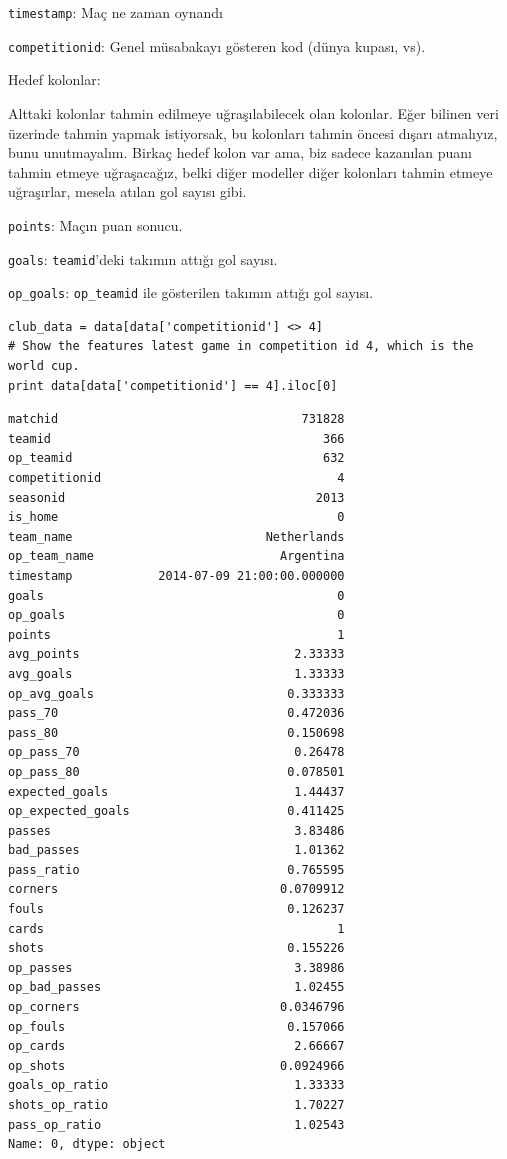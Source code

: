 \documentclass[12pt,fleqn]{article}\usepackage{../../common}
\begin{document}
\verb!timestamp!: Maç ne zaman oynandı

\verb!competitionid!: Genel müsabakayı gösteren kod (dünya kupası, vs).

Hedef kolonlar:

Alttaki kolonlar tahmin edilmeye uğraşılabilecek olan kolonlar. Eğer
bilinen veri üzerinde tahmin yapmak istiyorsak, bu kolonları tahmin öncesi
dışarı atmalıyız, bunu unutmayalım. Birkaç hedef kolon var ama, biz
sadece kazanılan puanı tahmin etmeye uğraşacağız, belki diğer modeller
diğer kolonları tahmin etmeye uğraşırlar, mesela atılan gol sayısı gibi.

\verb!points!: Maçın puan sonucu.

\verb!goals!: \verb!teamid!'deki takımın attığı gol sayısı.

\verb!op_goals!: \verb!op_teamid! ile gösterilen takımın attığı gol sayısı.

\begin{verbatim}
club_data = data[data['competitionid'] <> 4]
# Show the features latest game in competition id 4, which is the world cup.
print data[data['competitionid'] == 4].iloc[0]
\end{verbatim}

\begin{verbatim}
matchid                                  731828
teamid                                      366
op_teamid                                   632
competitionid                                 4
seasonid                                   2013
is_home                                       0
team_name                           Netherlands
op_team_name                          Argentina
timestamp            2014-07-09 21:00:00.000000
goals                                         0
op_goals                                      0
points                                        1
avg_points                              2.33333
avg_goals                               1.33333
op_avg_goals                           0.333333
pass_70                                0.472036
pass_80                                0.150698
op_pass_70                              0.26478
op_pass_80                             0.078501
expected_goals                          1.44437
op_expected_goals                      0.411425
passes                                  3.83486
bad_passes                              1.01362
pass_ratio                             0.765595
corners                               0.0709912
fouls                                  0.126237
cards                                         1
shots                                  0.155226
op_passes                               3.38986
op_bad_passes                           1.02455
op_corners                            0.0346796
op_fouls                               0.157066
op_cards                                2.66667
op_shots                              0.0924966
goals_op_ratio                          1.33333
shots_op_ratio                          1.70227
pass_op_ratio                           1.02543
Name: 0, dtype: object
\end{verbatim}
\end{document}
